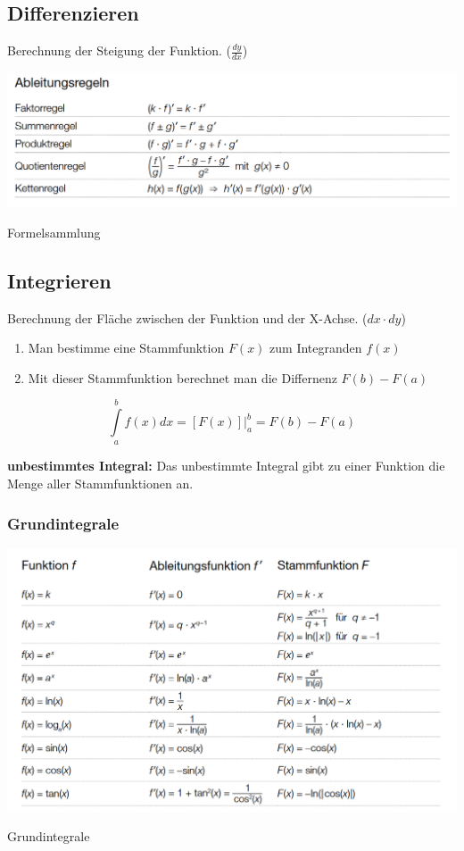 \subsection{Differenzieren}
Berechnung der Steigung der Funktion. ($\frac{dy}{dx}$)

\begin{center}
	\captionsetup{type=figure}
	\includegraphics[width=0.9\linewidth]{pictures/Ableitungsregeln_Formelsammlung_Matura}
	\caption{Formelsammlung~\cite[S. 13]{Formelsammlung_BHS}}
	\label{fig:ableitungsregeln}
\end{center}



\subsection{Integrieren}
Berechnung der Fläche zwischen der Funktion und der X-Achse. ($dx \cdot dy$)
\begin{enumerate}
	\item Man bestimme eine Stammfunktion $F(x)$ zum Integranden $f(x)$
	\item Mit dieser Stammfunktion berechnet man die Differnenz $F(b)-F(a)$
\end{enumerate}
\[\int\limits_a^b f(x) dx = \left . \left[F(x)\right] \right | _a^b = F(b)-F(a)\]

\textbf{unbestimmtes Integral:}
Das unbestimmte Integral gibt zu einer Funktion die Menge aller Stammfunktionen an.

%
\subsubsection{Grundintegrale}

\begin{center}
	\captionsetup{type=figure}
	\includegraphics[width=0.9\linewidth]{pictures/Grundintegrale_Formelsammlung_BHS}
	\caption{Grundintegrale \cite[S. 13]{Formelsammlung_BHS}}
	\label{fig:grundintegrale}
\end{center}

